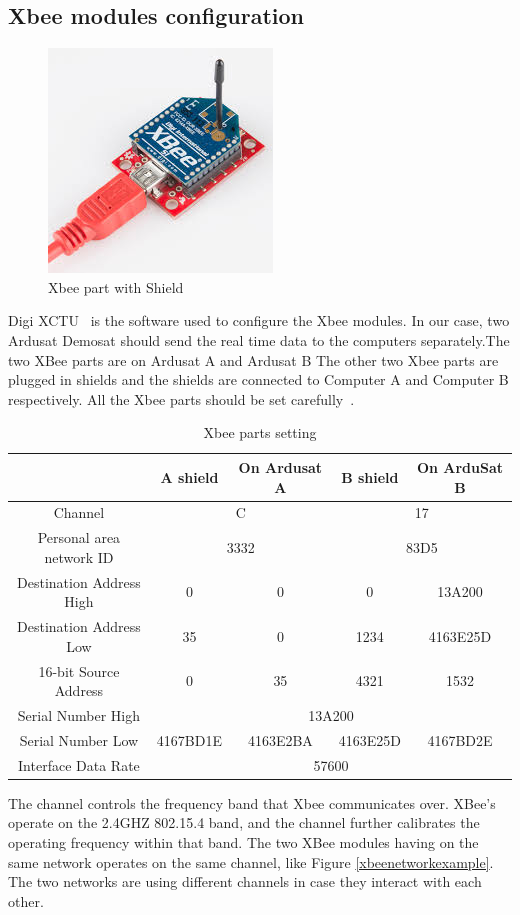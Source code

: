 \subsection{Xbee modules configuration}
\begin{figure}[!h]
\centering
\includegraphics{fig/DOE/XbeeShield}
\caption{Xbee part with Shield}
\end{figure}
Digi XCTU~\cite{DigiCite} is the software used to configure the Xbee modules. In our case, two Ardusat Demosat should send the real time data to the computers separately.The two XBee parts are on Ardusat A and Ardusat B The other two Xbee parts are plugged in shields and the shields are connected to Computer A and Computer B respectively. All the Xbee parts should be set carefully~\cite{XbeeSetting}. 
\begin{table}[!h]
\renewcommand\arraystretch{2}
	\begin{center}
	\caption{Xbee parts setting}\label{Xbee-configuration}
	\begin{tabular}{|c|c|c|c|c|}
	\hline
	\backslashbox{\textbf{Setting}}{\textbf{Xbee part}} & \textbf{A shield} & \textbf{On Ardusat A} & \textbf{B shield} & \textbf{On ArduSat B}\\ \hline
	Channel & \multicolumn{2}{c|}{C} &\multicolumn{2}{c|}{17}  \\ \hline
	Personal area network ID & \multicolumn{2}{c|}{3332}& \multicolumn{2}{c|}{83D5}\\ \hline
	Destination Address High & 0 & 0 & 0 & 13A200\\ \hline
	Destination Address Low & 35 & 0 & 1234&4163E25D\\ \hline
	16-bit Source Address & 0 & 35 & 4321 & 1532\\ \hline
	Serial Number High & \multicolumn{4}{c|}{13A200}\\ \hline
	Serial Number Low & 4167BD1E & 4163E2BA & 4163E25D & 4167BD2E\\ \hline
	Interface Data Rate	 & \multicolumn{4}{c|}{57600}\\ \hline
	\end{tabular}	
	\end{center}
\end{table}
The channel controls the frequency band that Xbee communicates over. XBee's operate on the 2.4GHZ 802.15.4 band, and the channel further calibrates the operating frequency within that band. The two XBee modules having on the same network operates on the same channel, like Figure \ref{xbeenetworkexample}.  The two networks are using different channels in case they interact with each other.

